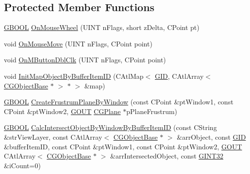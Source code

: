 \subsection*{Protected Member Functions}
\begin{DoxyCompactItemize}
\item 
\hyperlink{_g_types_8h_a2901915743626352a6820c5405f556dc}{G\+B\+O\+O\+L} \hyperlink{class_c_g3_d_view_a7af4ef43015da5f851ac69d0e463ef03}{On\+Mouse\+Wheel} (U\+I\+N\+T n\+Flags, short z\+Delta, C\+Point pt)
\item 
void \hyperlink{class_c_g3_d_view_a9db3e66f4cb0f955731d840cb1ea97fc}{On\+Mouse\+Move} (U\+I\+N\+T n\+Flags, C\+Point point)
\item 
void \hyperlink{class_c_g3_d_view_a3b589204edff37762b9b3bd1ea80c2c9}{On\+M\+Button\+Dbl\+Clk} (U\+I\+N\+T n\+Flags, C\+Point point)
\item 
void \hyperlink{class_c_g3_d_view_ad97aeaea01d99505244420a9ba4f9c6f}{Init\+Map\+Object\+By\+Buffer\+Item\+I\+D} (C\+Atl\+Map$<$ \hyperlink{_g_types_8h_a5b96ecb16d8e437977d12cd40aa6f6d8}{G\+I\+D}, C\+Atl\+Array$<$ \hyperlink{class_c_g_object_base}{C\+G\+Object\+Base} $\ast$ $>$ $\ast$ $>$ \&map)
\item 
\hyperlink{_g_types_8h_a2901915743626352a6820c5405f556dc}{G\+B\+O\+O\+L} \hyperlink{class_c_g3_d_view_a435cff19e02a6f76461d383d7e3a5372}{Create\+Frustrum\+Plane\+By\+Window} (const C\+Point \&pt\+Window1, const C\+Point \&pt\+Window2, \hyperlink{_g_types_8h_a0858ec221262e635612871d70ca233ad}{G\+O\+U\+T} \hyperlink{class_c_g_plane}{C\+G\+Plane} $\ast$p\+Plane\+Frustrum)
\item 
\hyperlink{_g_types_8h_a2901915743626352a6820c5405f556dc}{G\+B\+O\+O\+L} \hyperlink{class_c_g3_d_view_a95c2bc199d4c301725276cc0209dc352}{Calc\+Intersect\+Object\+By\+Window\+By\+Buffer\+Item\+I\+D} (const C\+String \&str\+View\+Layer, const C\+Atl\+Array$<$ \hyperlink{class_c_g_object_base}{C\+G\+Object\+Base} $\ast$ $>$ \&arr\+Object, const \hyperlink{_g_types_8h_a5b96ecb16d8e437977d12cd40aa6f6d8}{G\+I\+D} \&buffer\+Item\+I\+D, const C\+Point \&pt\+Window1, const C\+Point \&pt\+Window2, \hyperlink{_g_types_8h_a0858ec221262e635612871d70ca233ad}{G\+O\+U\+T} C\+Atl\+Array$<$ \hyperlink{class_c_g_object_base}{C\+G\+Object\+Base} $\ast$ $>$ \&arr\+Intersected\+Object, const \hyperlink{_g_types_8h_a40d8bc7c06b9e72906852691a4bf888e}{G\+I\+N\+T32} \&i\+Count=0)
\item 

\end{DoxyCompactItemize}

